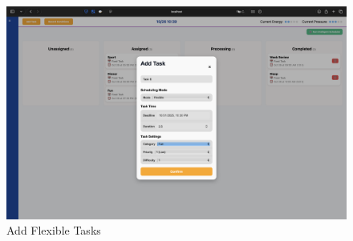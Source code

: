 \documentclass[12pt, a4paper]{article}
\begin{document}
\begin{enumerate}
                    \begin{figure}[H]
                        \centering
                        \includegraphics[width=\textwidth]{Images/System/ai_scheduling/add_flex.png}
                        \caption{Add Flexible Tasks}
                        \label{add_flex}
                    \end{figure}


\end{enumerate}
\end{document}
